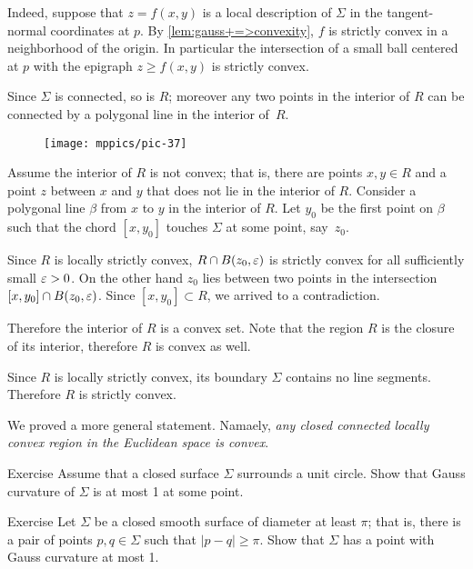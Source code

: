 Indeed, suppose that $z=f(x,y)$ is a local description of $\Sigma$ in the tangent-normal coordinates at $p$.
By \ref{lem:gauss+=>convexity}, $f$ is strictly convex in a neighborhood of the origin.
In particular the intersection of a small ball centered at $p$ with the epigraph $z\ge f(x,y)$ is strictly convex.

Since $\Sigma$ is connected, so is $R$;
moreover any two points in the interior of $R$ can be connected by a polygonal line in the interior of~$R$.

\begin{wrapfigure}{o}{43 mm}
\vskip-0mm
\centering
\texttt{[image: mppics/pic-37]}
\vskip-0mm
\end{wrapfigure}

Assume the interior of $R$ is not convex; that is, there are points $x,y\in R$ and a point $z$ between $x$ and $y$ that does not lie in the interior of $R$.
Consider a polygonal  line $\beta$ from $x$ to $y$ in the interior of $R$.
Let $y_0$ be the first point on $\beta$ such that the chord $[x,y_0]$ touches $\Sigma$ at some point, say~$z_0$.

Since $R$ is locally strictly convex, $R\z\cap B(z_0,\eps)$ is strictly convex for all sufficiently small $\varepsilon>0$.
On the other hand $z_0$ lies between two points in the intersection $[x,y_0]\cap B(z_0,\varepsilon)$.
Since $[x,y_0]\subset R$, we arrived to a contradiction.

Therefore the interior of $R$ is a convex set.
Note that the region $R$ is the closure of its interior, therefore $R$ is convex as well.

Since $R$ is locally strictly convex, its boundary $\Sigma$ contains no line segments.
Therefore $R$ is strictly convex.
\qeds

We proved a more general statement.
Namaely, {}\emph{any closed connected locally convex region in the Euclidean space is convex}.

\begin{thm}{Exercise}\label{ex:surrounds-disc}
Assume that a closed surface $\Sigma$ surrounds a unit circle.
Show that Gauss curvature of $\Sigma$ is at most 1 at some point. 
\end{thm} 

\begin{thm}{Exercise}\label{ex:small-gauss}
Let $\Sigma$ be a closed smooth surface of diameter at least $\pi$;
that is, there is a pair of points $p,q\in\Sigma$ such that $|p-q|\ge \pi$.
Show that $\Sigma$ has a point with Gauss curvature at most 1.
\end{thm}

